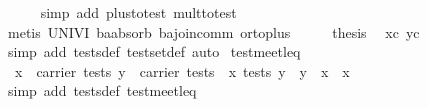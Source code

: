 \begin{isabellebody}
\ \ \ \ \isamarkupfalse%
\ {}simp\ add{}\ plus{}to{}test\ mult{}to{}test{}\isanewline
\ \ \ \ \isamarkupfalse%
\ {}metis\ UNIV{}I\ ba{}absorb{}\ ba{}join{}comm\ or{}to{}plus{}\isanewline
\isanewline
\ \ \isamarkupfalse%
\ \isamarkupfalse%
\ {}thesis\ \isamarkupfalse%
\ xc\ yc\isanewline
\ \ \ \ \isamarkupfalse%
\ {}simp\ add{}\ tests{}def\ test{}set{}def{}\ auto{}\isanewline
{}\isamarkupfalse%
%
\endisatagproof
{\isafoldproof}%
%
\isadelimproof
\isanewline
%
\endisadelimproof
\isanewline
{}\isamarkupfalse%
\ test{}meet{}leq{}\isanewline
\ \ {}{}x\ {}\ carrier\ tests{}\ y\ {}\ carrier\ tests{}\ {}\ {}x\ {}\isactrlbsub tests\isactrlesub \ y{}\ {}\ {}y\ {}\ x\ {}\ x{}{}\isanewline
%
\isadelimproof
\ \ %
\endisadelimproof
%
\isatagproof
{}\isamarkupfalse%
\ {}simp\ add{}\ tests{}def\ test{}meet{}leq{}{}%

\end{isabellebody}
